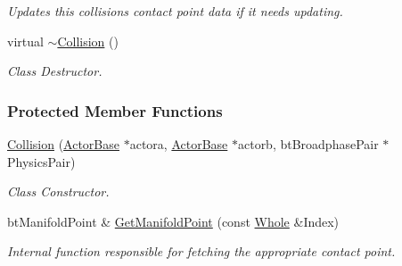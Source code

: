 \begin{DoxyCompactItemize}
\begin{DoxyCompactList}\small\item\em Updates this collisions contact point data if it needs updating. \item\end{DoxyCompactList}\item 
virtual \hyperlink{classMezzanine_1_1Collision_abeac6cfc637fe44493602a04f75c0232}{$\sim$Collision} ()
\begin{DoxyCompactList}\small\item\em Class Destructor. \item\end{DoxyCompactList}\end{DoxyCompactItemize}
\subsubsection*{Protected Member Functions}
\begin{DoxyCompactItemize}
\item 
\hyperlink{classMezzanine_1_1Collision_a83a68efcc824afa4d0ca19d5183712e4}{Collision} (\hyperlink{classMezzanine_1_1ActorBase}{ActorBase} $\ast$actora, \hyperlink{classMezzanine_1_1ActorBase}{ActorBase} $\ast$actorb, btBroadphasePair $\ast$PhysicsPair)
\begin{DoxyCompactList}\small\item\em Class Constructor. \item\end{DoxyCompactList}\item 
\hypertarget{classMezzanine_1_1Collision_ab337bbfb55f330ac095934cd1a0e40ed}{
btManifoldPoint \& \hyperlink{classMezzanine_1_1Collision_ab337bbfb55f330ac095934cd1a0e40ed}{GetManifoldPoint} (const \hyperlink{namespaceMezzanine_adcbb6ce6d1eb4379d109e51171e2e493}{Whole} \&Index)}
\label{classMezzanine_1_1Collision_ab337bbfb55f330ac095934cd1a0e40ed}

\begin{DoxyCompactList}\small\item\em Internal function responsible for fetching the appropriate contact point. \item\end{DoxyCompactList}\end{DoxyCompactItemize}
